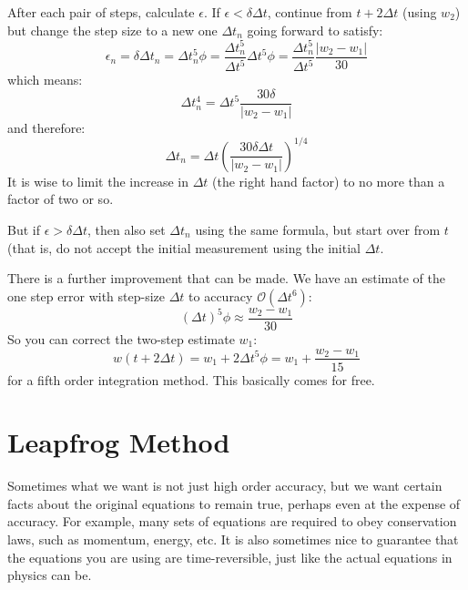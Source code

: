 After each pair of steps, calculate $\epsilon$. If $\epsilon < \delta \Delta
t $, continue from $t+ 2\Delta t$ (using $w_2$) but change the
step size to a new one $\Delta t_n$ going forward to satisfy:
\begin{equation}
  \epsilon_n = \delta \Delta t_n = \Delta t_n^5 \phi
  = \frac{\Delta t_n^5}{\Delta t^5} \Delta t^5 \phi
  = \frac{\Delta t_n^5}{\Delta t^5} \frac{\left|w_2 - w_1\right|}{30}
\end{equation}
which means:
\begin{equation}
\Delta t_n^4 = \Delta t^5 \frac{30 \delta}{\left|w_2 - w_1\right|}
\end{equation}
and therefore:
\begin{equation}
\Delta t_n = \Delta t \left(\frac{30 \delta \Delta t}{\left|w_2 -
  w_1\right|}\right)^{1/4}
\end{equation}
It is wise to limit the increase in $\Delta t$ (the right hand factor)
to no more than a factor of two or so.

But if $\epsilon > \delta \Delta t $, then also set $\Delta t_n$
using the same formula, but start over from $t$ (that is, do not
accept the initial measurement using the initial $\Delta t$.

There is a further improvement that can be made. We have an estimate
of the one step error with step-size $\Delta t$ to accuracy
$\mathcal{O}(\Delta t^6)$:
\begin{equation}
  (\Delta t)^5 \phi \approx \frac{w_2 - w_1}{30}
\end{equation}
So you can correct the two-step estimate $w_1$:
\begin{equation}
w(t+ 2\Delta t) = w_1 + 2 \Delta t^5 \phi = w_1 + 
  \frac{w_2 - w_1}{15}
\end{equation}
for a fifth order integration method. This basically comes for free. 

\section{Leapfrog Method}

Sometimes what we want is not just high order accuracy, but we want
certain facts about the original equations to remain true, perhaps
even at the expense of accuracy. For example, many sets of equations
are required to obey conservation laws, such as momentum, energy,
etc. It is also sometimes nice to guarantee that the equations you are
using are time-reversible, just like the actual equations in physics
can be.

